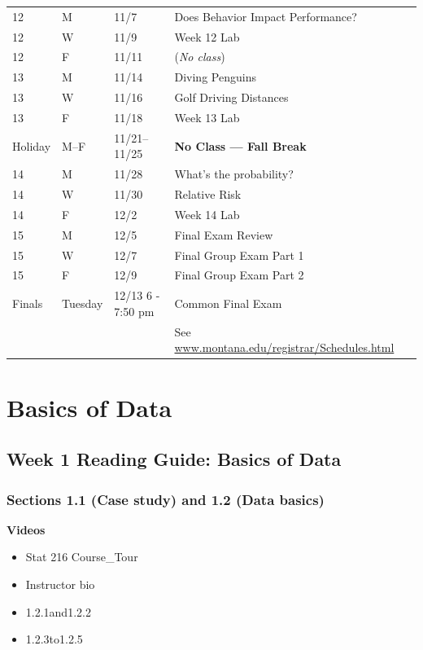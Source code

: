 \documentclass[
]{report}
\providecommand{\tightlist}{%
  \setlength{\itemsep}{0pt}\setlength{\parskip}{0pt}}
\begin{document}
\begin{longtable}{|l|l|l|l|p{}|}
12& M& 11/7& Does Behavior Impact Performance? \\*
12& W& 11/9& Week 12 Lab \\*
12& F& 11/11& (\textit{No class}) \\ \hline
13& M& 11/14& Diving Penguins  \\*
13& W& 11/16& Golf Driving Distances \\*
13& F& 11/18& Week 13 Lab \\ \hline
Holiday& M--F& 11/21--11/25& \textbf{No Class --- Fall Break} \\ \hline
14& M& 11/28& What's the probability? \\*
14& W& 11/30& Relative Risk \\*
14& F& 12/2& Week 14 Lab \\ \hline
15& M& 12/5& Final Exam Review \\*
15& W& 12/7& Final Group Exam Part 1 \\*
15& F& 12/9& Final Group Exam Part 2 \\ \hline
Finals& Tuesday & 12/13 6 - 7:50 pm & Common Final Exam \\
&  &  & See \url{www.montana.edu/registrar/Schedules.html} \\ \hline

\end{longtable}

\nocite{*}

\hypertarget{basics-of-data}{%
\chapter{Basics of Data}\label{basics-of-data}}

\hypertarget{week-1-reading-guide-basics-of-data}{%
\section{Week 1 Reading Guide: Basics of Data}\label{week-1-reading-guide-basics-of-data}}

\hypertarget{sections-1.1-case-study-and-1.2-data-basics}{%
\subsection*{Sections 1.1 (Case study) and 1.2 (Data basics)}\label{sections-1.1-case-study-and-1.2-data-basics}}

\textbf{Videos}

\begin{itemize}
\tightlist
\item
  Stat 216 Course\_Tour
\item
  Instructor bio
\item
  1.2.1and1.2.2
\item
  1.2.3to1.2.5
\end{itemize}
\end{document}
